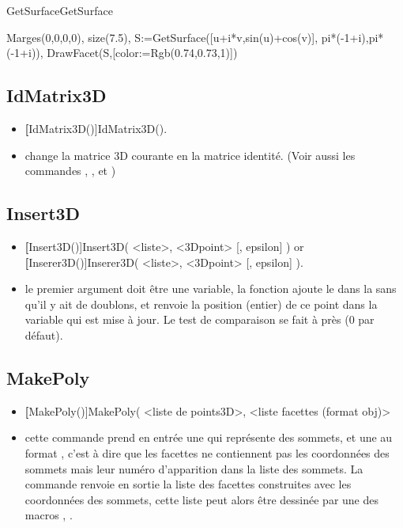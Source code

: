 \begin{demo}{GetSurface}{GetSurface}
\begin{texgraph}[name=GetSurface]
 Marges(0,0,0,0), size(7.5),
 S:=GetSurface([u+i*v,sin(u)+cos(v)],
        pi*(-1+i),pi*(-1+i)),
 DrawFacet(S,[color:=Rgb(0.74,0.73,1)]) 
\end{texgraph}
\end{demo}

\subsection{IdMatrix3D}\label{cmdIdMatrix3D}

\begin{itemize}
 \item \util \textbf[IdMatrix3D()]{IdMatrix3D()}.
 \item \desc change la matrice 3D courante en la matrice identité. (Voir aussi les commandes , , et ) 
\end{itemize}

\subsection{Insert3D}\label{cmdInserer3D}

\begin{itemize}
 \item \util \textbf[Insert3D()]{Insert3D( <liste>, <3Dpoint> [, epsilon] )} or \textbf[Inserer3D()]{Inserer3D( <liste>, <3Dpoint> [, epsilon] )}.
 \item \desc le premier argument doit être une variable, la fonction ajoute le  dans la  sans qu'il y ait de doublons, et renvoie la position (entier) de ce point dans la variable  qui est mise à jour. Le test de comparaison se fait à  près (0 par défaut).
\end{itemize}

\subsection{MakePoly}\label{cmdMakePoly}
\begin{itemize}
 \item \util \textbf[MakePoly()]{MakePoly( <liste de points3D>, <liste facettes (format obj)> }
 \item \desc cette commande prend en entrée une  qui représente des sommets, et une  au format , c'est à dire que les facettes ne contiennent pas les coordonnées des sommets mais leur numéro d'apparition dans la liste des sommets. La commande renvoie en sortie la liste des facettes construites avec les coordonnées des sommets, cette liste peut alors être dessinée par une des macros , .
\end{itemize}


